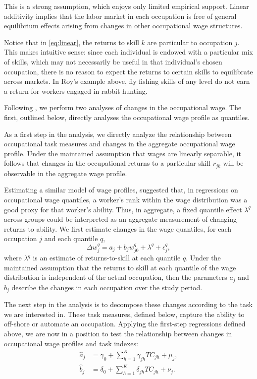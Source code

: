 This is a strong assumption, which enjoys only limited empirical support. Linear additivity implies that the labor market in each occupation is free of general equilibrium effects arising from changes in other occupational wage structures.

Notice that in \eqref{eq:linear}, the returns to skill $k$ are particular to occupation $j$. This makes intuitive sense: since each individual is endowed with a particular mix of skills, which may not necessarily be useful in that individual's chosen occupation, there is no reason to expect the returns to certain skills to equilibrate across markets. In Roy's example above, fly fishing skills of any level do not earn a return for workers engaged in rabbit hunting. %

Following \citet{Firpo2011}, we perform two analyses of changes in the occupational wage. The first, outlined below, directly analyses the occupational wage profile as quantiles.

As a first step in the analysis, we directly analyze the relationship between occupational task measures and changes in the aggregate occupational wage profile. Under the maintained assumption that wages are linearly separable, it follows that changes in the occupational returns to a particular skill $r_{jk}$ will be observable in the aggregate wage profile.

Estimating a similar model of wage profiles, \citet{Juhn1993} suggested that, in regressions on occupational wage quantiles, a worker's rank within the wage distribution was a good proxy for that worker's ability. Thus, in aggregate, a fixed quantile effect $\lambda^q$ across groups could be interpreted as an aggregate measurement of changing returns to ability. We first estimate changes in the wage quantiles, for each occupation $j$ and each quantile $q$,
\begin{equation} 
  \Delta w_j^q = a_j + b_jw_{j0}^q + \lambda^q + \epsilon^q_j, \label{eq:quantiles}
\end{equation}
where $\lambda^q$ is an estimate of returns-to-skill at each quantile $q$. Under the maintained assumption that the returns to skill at each quantile of the wage distribution is independent of the actual occupation, then the parameters $a_j$ and $b_j$ describe the changes in each occupation over the study period.

The next step in the analysis is to decompose these changes according to the task we are interested in. These task measures, defined below, capture the ability to off-shore or automate an occupation. Applying the first-step regressions defined above, we are now in a position to test the relationship between changes in occupational wage profiles and task indexes:
\begin{align}
  \hat{a}_j &= \gamma_0 + \sum_{h=1}^K\gamma_{jh}TC_{jh} + \mu_j, \label{eq:aeq} \\
  \hat{b}_j &= \delta_0 + \sum_{h=1}^K\delta_{jh}TC_{jh} + \nu_j. \label{eq:beq}
\end{align}

